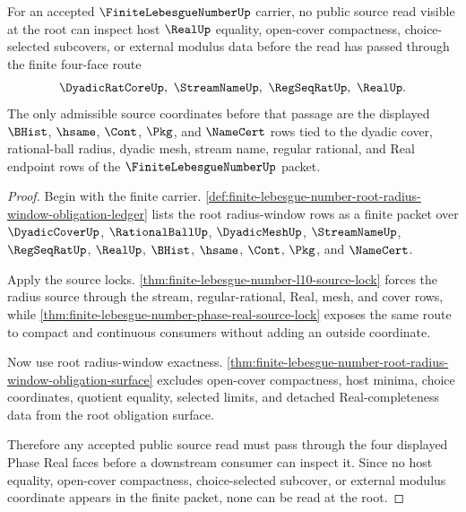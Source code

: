 \begin{theorem}
\label{thm:finite-lebesgue-number-open-phase-source-nonescape}
For an accepted $\FiniteLebesgueNumberUp$ carrier, no public source read visible at the root can inspect host $\RealUp$ equality, open-cover compactness, choice-selected subcovers, or external modulus data before the read has passed through the finite four-face route
$$
\DyadicRatCoreUp,\ \StreamNameUp,\ \RegSeqRatUp,\ \RealUp .
$$
The only admissible source coordinates before that passage are the displayed $\BHist$, $\hsame$, $\Cont$, $\Pkg$, and $\NameCert$ rows tied to the dyadic cover, rational-ball radius, dyadic mesh, stream name, regular rational, and Real endpoint rows of the $\FiniteLebesgueNumberUp$ packet.
\end{theorem}
\begin{proof}
Begin with the finite carrier. \autoref{def:finite-lebesgue-number-root-radius-window-obligation-ledger} lists the root radius-window rows as a finite packet over $\DyadicCoverUp$, $\RationalBallUp$, $\DyadicMeshUp$, $\StreamNameUp$, $\RegSeqRatUp$, $\RealUp$, $\BHist$, $\hsame$, $\Cont$, $\Pkg$, and $\NameCert$.

Apply the source locks. \autoref{thm:finite-lebesgue-number-l10-source-lock} forces the radius source through the stream, regular-rational, Real, mesh, and cover rows, while \autoref{thm:finite-lebesgue-number-phase-real-source-lock} exposes the same route to compact and continuous consumers without adding an outside coordinate.

Now use root radius-window exactness. \autoref{thm:finite-lebesgue-number-root-radius-window-obligation-surface} excludes open-cover compactness, host minima, choice coordinates, quotient equality, selected limits, and detached Real-completeness data from the root obligation surface.

Therefore any accepted public source read must pass through the four displayed Phase Real faces before a downstream consumer can inspect it. Since no host equality, open-cover compactness, choice-selected subcover, or external modulus coordinate appears in the finite packet, none can be read at the root.
\end{proof}


